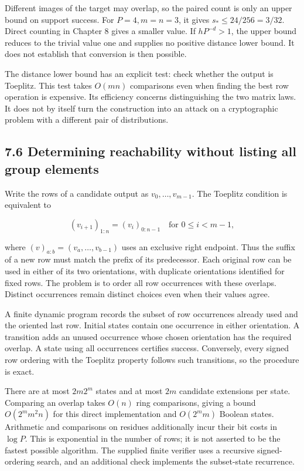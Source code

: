 \documentclass[
]{article}
\begin{document}
Different images of the target may overlap, so the paired count is only
an upper bound on support success. For \(P=4,m=n=3\), it gives
\(s_*\le24/256=3/32\). Direct counting in Chapter 8 gives a smaller
value. If \(hP^{-d}>1\), the upper bound reduces to the trivial value
one and supplies no positive distance lower bound. It does not establish
that conversion is then possible.

The distance lower bound has an explicit test: check whether the output
is Toeplitz. This test takes \(O(mn)\) comparisons even when finding the
best row operation is expensive. Its efficiency concerns distinguishing
the two matrix laws. It does not by itself turn the construction into an
attack on a cryptographic problem with a different pair of
distributions.

\subsection{7.6 Determining reachability without listing all group
elements}\label{determining-reachability-without-listing-all-group-elements}

Write the rows of a candidate output as \(v_0,\ldots,v_{m-1}\). The
Toeplitz condition is equivalent to

\[
(v_{i+1})_{1:n}=(v_i)_{0:n-1}
\quad\text{for }0\le i<m-1,
\]

where \((v)_{a:b}=(v_a,\ldots,v_{b-1})\) uses an exclusive right
endpoint. Thus the suffix of a new row must match the prefix of its
predecessor. Each original row can be used in either of its two
orientations, with duplicate orientations identified for fixed rows. The
problem is to order all row occurrences with these overlaps. Distinct
occurrences remain distinct choices even when their values agree.

A finite dynamic program records the subset of row occurrences already
used and the oriented last row. Initial states contain one occurrence in
either orientation. A transition adds an unused occurrence whose chosen
orientation has the required overlap. A state using all occurrences
certifies success. Conversely, every signed row ordering with the
Toeplitz property follows such transitions, so the procedure is exact.

There are at most \(2m2^m\) states and at most \(2m\) candidate
extensions per state. Comparing an overlap takes \(O(n)\) ring
comparisons, giving a bound \(O(2^m m^2n)\) for this direct
implementation and \(O(2^m m)\) Boolean states. Arithmetic and
comparisons on residues additionally incur their bit costs in
\(\log P\). This is exponential in the number of rows; it is not
asserted to be the fastest possible algorithm. The supplied finite
verifier uses a recursive signed-ordering search, and an additional
check implements the subset-state recurrence.
\end{document}
